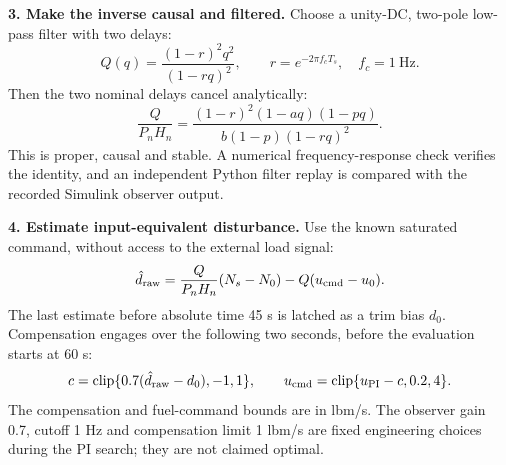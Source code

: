 \documentclass[11pt,a4paper]{article}
\begin{document}
\textbf{3. Make the inverse causal and filtered.} Choose a unity-DC, two-pole low-pass filter with two delays:
\begin{equation}Q(q)=\frac{(1-r)^2q^2}{(1-rq)^2},\qquad r=e^{-2\pi f_cT_s},\quad f_c=1\ \mathrm{Hz}.\end{equation}
Then the two nominal delays cancel analytically:
\begin{equation}\frac{Q}{P_nH_n}=\frac{(1-r)^2(1-aq)(1-pq)}{b(1-p)(1-rq)^2}.\end{equation}
This is proper, causal and stable. A numerical frequency-response check verifies the identity, and an independent Python filter replay is compared with the recorded Simulink observer output.

\textbf{4. Estimate input-equivalent disturbance.} Use the known saturated command, without access to the external load signal:
\begin{equation}\hat d_{\rm raw}=\frac{Q}{P_nH_n}(N_s-N_0)-Q(u_{\rm cmd}-u_0).\end{equation}
The last estimate before absolute time 45 s is latched as a trim bias $d_0$. Compensation engages over the following two seconds, before the evaluation starts at 60 s:
\begin{equation}c=\operatorname{clip}\{0.7(\hat d_{\rm raw}-d_0),-1,1\},\qquad
u_{\rm cmd}=\operatorname{clip}\{u_{\rm PI}-c,0.2,4\}.\end{equation}
The compensation and fuel-command bounds are in lbm/s. The observer gain 0.7, cutoff 1 Hz and compensation limit 1 lbm/s are fixed engineering choices during the PI search; they are not claimed optimal.
\end{document}
